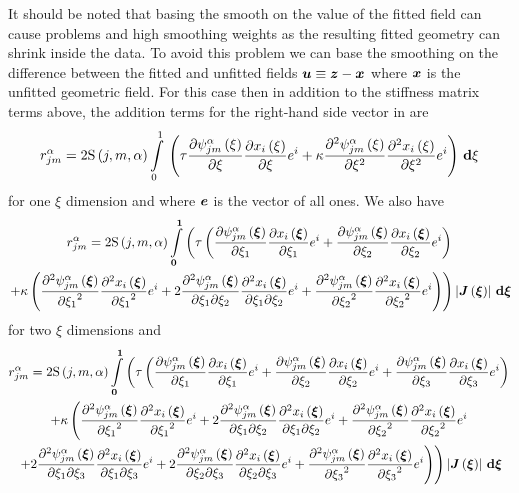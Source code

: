 It should be noted that basing the smooth on the value of the fitted field can
cause problems and high smoothing weights as the resulting fitted geometry can
shrink inside the data. To avoid this problem we can base the smoothing on the
difference between the fitted and unfitted fields \ie
$\boldsymbol{u}\equiv\boldsymbol{z}-\boldsymbol{x}$ where $\boldsymbol{x}$ is the unfitted
geometric field. For this case then in addition to the
stiffness matrix terms above, the addition terms for the right-hand side
vector in  are
\begin{equation}
  r^{\alpha}_{jm}=2   \mathrm{S} \left( j,m,\alpha \right)    \displaystyle\int\limits_{0}^{1} \,\left( 
      \tau \dfrac{\partial    \psi_{jm}^{\alpha} \left( \xi \right)  }{\partial \xi}  \dfrac{\partial  x_{i}\left( \xi \right) }{\partial \xi} e^{i}+
  \kappa \dfrac{\partial^{2}    \psi_{jm}^{\alpha} \left( \xi \right)  }{\partial {\xi}^{2}}  \dfrac{\partial^{2}  x_{i}\left( \xi \right) }{\partial {\xi}^{2}} e^{i} \right)\, \boldsymbol{\mathrm{d}} \xi 
\end{equation}
for one $\xi$ dimension and where $\boldsymbol{e}$ is the vector of all ones. We
also have
\begin{multline}
  r^{\alpha}_{jm}=2\idxgsf{j}{m}{\alpha}\dintl{\vect{0}}{\vect{1}}\left(
  \tau\pbrac{\delby{\idxgbfn{j}{m}{\alpha}{\vectr{\xi}}}{\xione}\delby{\fnof{x_{i}}{\vectr{\xi}}}{\xione}e^{i}+
    \delby{\idxgbfn{j}{m}{\alpha}{\vectr{\xi}}}{\xitwo}\delby{\fnof{x_{i}}{\vectr{\xi}}}{\xitwo}e^{i}}\right. \\
  \left.+\kappa\pbrac{\deltwosqby{\idxgbfn{j}{m}{\alpha}{\vectr{\xi}}}{\xione}\deltwosqby{\fnof{x_{i}}{\vectr{\xi}}}{\xione}e^{i}
    +2\deltwoby{\idxgbfn{j}{m}{\alpha}{\vectr{\xi}}}{\xione}{\xitwo}\deltwoby{\fnof{x_{i}}{\vectr{\xi}}}{\xione}{\xitwo}e^{i}
    +\deltwosqby{\idxgbfn{j}{m}{\alpha}{\vectr{\xi}}}{\xitwo}\deltwosqby{\fnof{x_{i}}{\vectr{\xi}}}{\xitwo}e^{i}
  }\right)\abs{\fnof{\matr{J}}{\vectr{\xi}}}\,\exteriorderivop\vect{\xi}
\end{multline}
for two $\xi$ dimensions and
\begin{multline}
  r^{\alpha}_{jm}=2\idxgsf{j}{m}{\alpha}\dintl{\vect{0}}{\vect{1}}\left(
  \tau\pbrac{\delby{\idxgbfn{j}{m}{\alpha}{\vectr{\xi}}}{\xione}\delby{\fnof{x_{i}}{\vectr{\xi}}}{\xione}e^{i}+
    \delby{\idxgbfn{j}{m}{\alpha}{\vectr{\xi}}}{\xitwo}\delby{\fnof{x_{i}}{\vectr{\xi}}}{\xitwo}e^{i}+
    \delby{\idxgbfn{j}{m}{\alpha}{\vectr{\xi}}}{\xithree}\delby{\fnof{x_{i}}{\vectr{\xi}}}{\xithree}e^{i}}\right. \\
  +\kappa\left(\deltwosqby{\idxgbfn{j}{m}{\alpha}{\vectr{\xi}}}{\xione}\deltwosqby{\fnof{x_{i}}{\vectr{\xi}}}{\xione}e^{i}+
  2\deltwoby{\idxgbfn{j}{m}{\alpha}{\vectr{\xi}}}{\xione}{\xitwo}\deltwoby{\fnof{x_{i}}{\vectr{\xi}}}{\xione}{\xitwo}e^{i}+
  \deltwosqby{\idxgbfn{j}{m}{\alpha}{\vectr{\xi}}}{\xitwo}\deltwosqby{\fnof{x_{i}}{\vectr{\xi}}}{\xitwo}e^{i}\right. \\
  \left.\left.+2\deltwoby{\idxgbfn{j}{m}{\alpha}{\vectr{\xi}}}{\xione}{\xithree}\deltwoby{\fnof{x_{i}}{\vectr{\xi}}}{\xione}{\xithree}e^{i}+
  2\deltwoby{\idxgbfn{j}{m}{\alpha}{\vectr{\xi}}}{\xitwo}{\xithree}\deltwoby{\fnof{x_{i}}{\vectr{\xi}}}{\xitwo}{\xithree}e^{i}+
  \deltwosqby{\idxgbfn{j}{m}{\alpha}{\vectr{\xi}}}{\xithree}\deltwosqby{\fnof{x_{i}}{\vectr{\xi}}}{\xithree}e^{i}
  \right)\right)\abs{\fnof{\matr{J}}{\vectr{\xi}}}\,\exteriorderivop\vect{\xi}
\end{multline}
